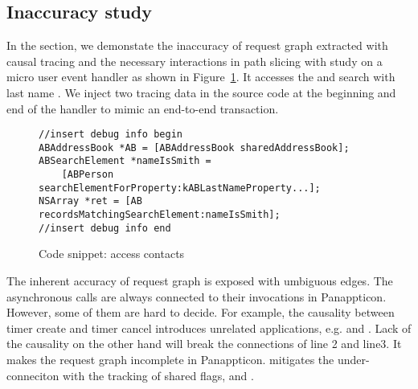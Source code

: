 \subsection{Inaccuracy study} \label{sec:toystudy}

In the section, we demonstate the inaccuracy of request graph extracted with
causal tracing and the necessary interactions in path slicing with study on
a micro user event handler as shown in Figure~\ref{fig:toyapp}. It accesses the
 and search with last name . We inject two tracing
data in the source code at the beginning and end of the handler to mimic an
end-to-end transaction.

\begin{figure}[t]
\begin{lstlisting}
//insert debug info begin
ABAddressBook *AB = [ABAddressBook sharedAddressBook];
ABSearchElement *nameIsSmith =
	[ABPerson searchElementForProperty:kABLastNameProperty...];
NSArray *ret = [AB recordsMatchingSearchElement:nameIsSmith]; 
//insert debug info end
\end{lstlisting}
\vspace{-0.5cm}
    \caption{Code snippet: access contacts}
    \label{fig:toyapp}
\end{figure}


The inherent accuracy of request graph is exposed with umbiguous edges. The
asynchronous calls are always connected to their invocations in Panappticon.
However, some of them are hard to decide. For example, the causality between
timer create and timer cancel introduces unrelated applications, e.g. 
and . Lack of the causality on the other hand will break the
connections of line 2 and line3. It makes the request graph incomplete in
Panappticon. \xxx mitigates the under-conneciton with the tracking of shared
flags,  and .


